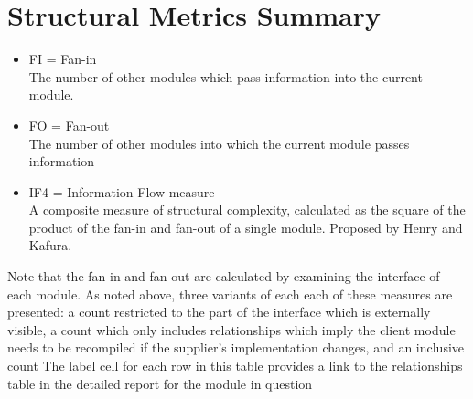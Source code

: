 \section{Structural Metrics Summary}
\begin{itemize}
\item FI = Fan-in\\ 
 The number of other modules which pass information into the current module. 
\item FO = Fan-out\\ 
 The number of other modules into which the current module passes information 
\item IF4 = Information Flow measure\\ 
 A composite measure of structural complexity, calculated as the square of the product of the fan-in and fan-out of a single module.
Proposed by Henry and Kafura. 

\end{itemize}
 Note that the fan-in and fan-out are calculated by examining the interface of each module. As noted above, three variants of each each of
these measures are presented: a count restricted to the part of the interface which is externally visible, a count which only includes
relationships which imply the client module needs to be recompiled if the supplier's implementation changes, and an inclusive count The
label cell for each row in this table provides a link to the relationships table in the detailed report for the module in question 

